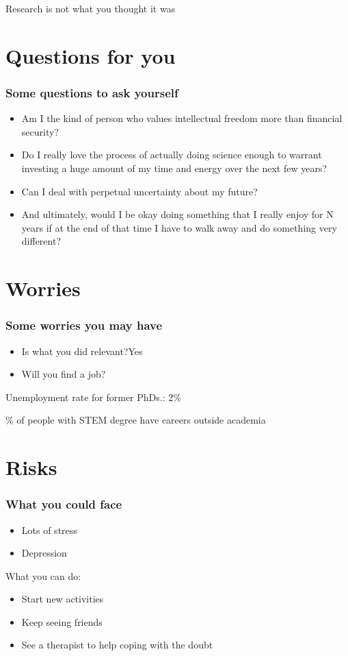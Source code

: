 \documentclass[]{beamer}
\begin{document}
\begin{frame}
\centering
Research is not what you thought it was
\end{frame}

\section[Questions]{Questions for you}
\begin{frame}
\frametitle{Some questions to ask yourself}
\begin{itemize}
\item Am I the kind of person who values intellectual freedom more than financial security? \pause
\item Do I really love the process of actually doing science enough to warrant investing a huge amount of my time and energy over the next few years? \pause
\item Can I deal with perpetual uncertainty about my future? \pause
\item And ultimately, would I be okay doing something that I really enjoy for N years if at the end of that time I have to walk away and do something very different?
\end{itemize}
\end{frame}

\section{Worries}
\begin{frame}
\frametitle{Some worries you may have}
\begin{itemize}
\item Is what you did relevant?\pause \quad \alert{Yes} \pause
\item Will you find a job?
\end{itemize}
\end{frame}

\begin{frame}
Unemployment rate for former PhDs.: 2\%
\end{frame}

\begin{frame}
\% of people with STEM degree have careers outside academia
\end{frame}

\section{Risks}
\begin{frame}
\frametitle{What you could face}
\begin{itemize}
\item Lots of stress
\item Depression
\end{itemize}\pause
What you can do:
\begin{itemize}
\item Start new activities
\item Keep seeing friends
\item See a therapist to help coping with the doubt
\end{itemize}
\end{frame}
\end{document}
